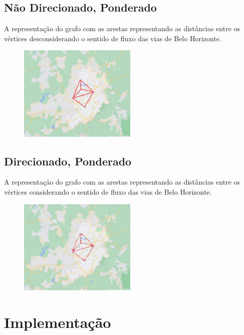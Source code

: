 \documentclass[12pt]{article}
\begin{document}
\subsection{Não Direcionado, Ponderado}
A representação do grafo com as arestas representando as distâncias entre os vértices desconsiderando o sentido de fluxo das vias de Belo Horizonte.
\begin{center}
    
    \begin{figure}[h!]
        \includegraphics[trim={10cm 7cm 7cm 7cm},clip, width=0.5\textwidth]{imagens/grafos5.jpeg}
    \end{figure}


\end{center}
\subsection{Direcionado, Ponderado}
A representação do grafo com as arestas representando as distâncias entre os vértices considerando o sentido de fluxo das vias de Belo Horizonte.
\begin{center}
    
    \begin{figure}[h!]
        \includegraphics[trim={10cm 7cm 7cm 7cm},clip, width=0.5\textwidth]{imagens/grafos3.jpeg}
    \end{figure}


\end{center}
\section{Implementação}
\end{document}
